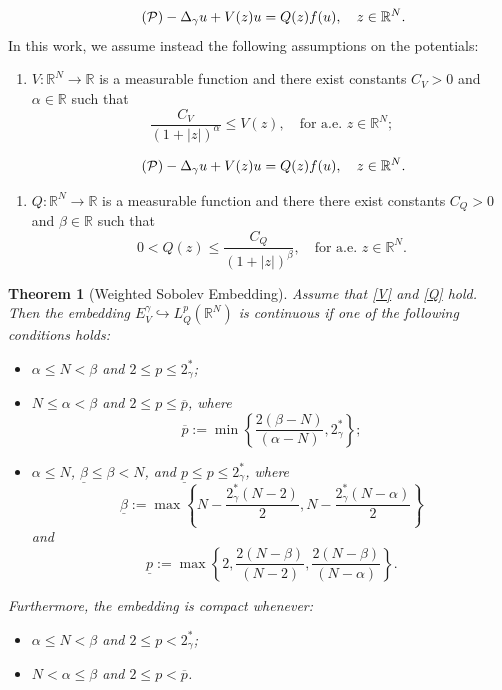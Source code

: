 \documentclass[10pt,a4paper]{amsart}
\newtheorem{theorem}{Theorem}
\begin{document}
\begin{equation}\tag{$\mathcal{P}$}\label{P}
	-\Delta_\gamma u + V(z)u = Q(z)f(u), \quad z\in \mathbb{R}^N.
\end{equation}
In this work, we assume instead the following assumptions on the potentials:
\begin{enumerate}[label=($V$),ref=$(V)$]
	\item \label{V} $V: \mathbb{R}^N\to \mathbb{R}$ is a measurable function and there exist constants  $C_V>0$ and $\alpha\in\mathbb{R}$ such that
	$$
	\frac{C_V}{\left(1+|z|\right)^\alpha}\leq V(z), \quad\mbox{for a.e. } z\in\mathbb{R}^N;
	$$
\end{enumerate}

\begin{equation}\tag{$\mathcal{P}$}
	-\Delta_\gamma u + V(z)u = Q(z)f(u), \quad z\in \mathbb{R}^N.
\end{equation}

\begin{enumerate}[label=($Q$),ref=$(Q)$]
	\item \label{Q} $Q: \mathbb{R}^N\to \mathbb{R}$ is a measurable function and there there exist constants   $C_Q>0$ and $\beta\in\mathbb{R}$ such that
	$$
	0<Q(z)\leq \frac{C_Q}{\left(1+|z|\right)^\beta}, \quad\mbox{for a.e. } z\in\mathbb{R}^N.
	$$
\end{enumerate}

\begin{theorem}[Weighted Sobolev Embedding]
	\label{imersao} Assume that \ref{V} and \ref{Q} hold. Then the embedding $E_V^\gamma \hookrightarrow L^p_Q(\mathbb{R}^N)$ is continuous  if one of the following conditions holds: 	
	\begin{itemize}
		\item [(i)] $\alpha \leq  N < \beta$ and $2\leq p \leq 2_\gamma^*$;
		
		\item[(ii)] $N
        \leq\alpha < \beta$ and $2\leq p \leq \overline{p}$,
		where
		$$
		\overline{p}:=\min\left\lbrace \frac{2(\beta-N)}{(\alpha-N)},2_\gamma^* \right\rbrace;
		$$
		
		\item [(iii)] $\alpha\leq N$, $ \underline{\beta} \leq \beta <N$, and $\underline{p}\leq p\leq2_\gamma^*$,
		where
		$$
		\underline{\beta}:=\max\left\lbrace N-\frac{2_\gamma^*(N-2)}{2},N-\frac{2_\gamma^*(N-\alpha)}{2}\right\rbrace 
		$$
		and
		$$
		\underline{p}:=\max\left\lbrace 2, \frac{2(N-\beta)}{(N-2)}, \frac{2(N-\beta)}{(N-\alpha)} \right\rbrace.
		$$
		
		
	\end{itemize}
	Furthermore, the embedding is compact whenever:
	\begin{itemize}
		\item [(i')] $\alpha \leq  N < \beta$ and $2\leq p < 2_\gamma^*$;
		
		\item[(ii')] $N<\alpha\leq\beta$ and $2\leq p < \overline{p}$.
		
		
	\end{itemize}
\end{theorem}
\end{document}
